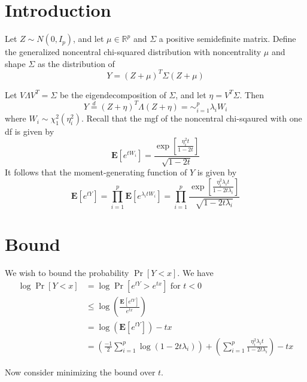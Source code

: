 \documentclass[12pt]{article}
\begin{document}
\maketitle

\newcommand{\tr}{\text{tr}}
\newcommand{\E}{\textbf{E}}
\newcommand{\diag}{\text{diag}}
\newcommand{\argmax}{\text{argmax}}
\newcommand{\Cov}{\text{Cov}}
\newcommand{\Var}{\text{Var}}
\newcommand{\argmin}{\text{argmin}}
\newcommand{\Vol}{\text{Vol}}
\newcommand{\comm}[1]{}

\section{Introduction}

Let $Z \sim N(0, I_p)$, and let $\mu \in \mathbb{R}^p$ and $\Sigma$ a
positive semidefinite matrix.  Define the generalized noncentral
chi-squared distribution with noncentrality $\mu$ and shape $\Sigma$
as the distribution of
\[
Y = (Z + \mu)^T \Sigma (Z + \mu)
\]

Let $V\Lambda V^T = \Sigma$ be the eigendecomposition of $\Sigma$,
and let $\eta = V^T \Sigma$.
Then
\[
Y \stackrel{d}{=} (Z + \eta)^T \Lambda (Z+\eta) = \sim_{i=1}^p \lambda_i W_i
\]
where $W_i \sim \chi^2_1(\eta_i^2)$.
Recall that the mgf of the noncentral chi-sqaured with one df is given by
\[
\E[e^{tW_i}] = \frac{\exp[\frac{\eta_i^2 t}{1-2t}]}{\sqrt{1-2t}}
\]
It follows that the moment-generating function of $Y$ is given by
\[
\E[e^{tY}] = \prod_{i=1}^p \E[e^{\lambda_i t W_i}] = \prod_{i=1}^p \frac{\exp[\frac{\eta_i^2 \lambda_i t}{1-2t \lambda_i}]}{\sqrt{1-2t \lambda_i}}
\]

\section{Bound}

We wish to bound the probability $\Pr[Y < x]$.
We have
\begin{align*}
\log \Pr[Y < x] &= \log \Pr[e^{tY} > e^{tx}]\text{ for }t < 0
\\&\leq \log\left(\frac{\E[e^{tY}]}{e^{tx}}\right)
\\&= \log(\E[e^{tY}]) - tx
\\&= \left(\frac{-1}{2} \sum_{i=1}^p \log(1 - 2t\lambda_i)\right) + \left(\sum_{i=1}^p \frac{\eta_i^2 \lambda_i t}{1 - 2t\lambda_i }\right) - tx
\end{align*}

Now consider minimizing the bound over $t$.
\end{document}
